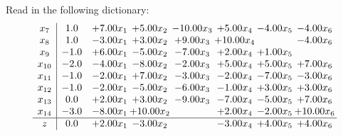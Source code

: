 \documentclass[9pt]{article}
\begin{document}
Read in the following dictionary:
\[\begin{array}{c| c c@{\hskip 2pt} c@{\hskip 2pt} c@{\hskip 2pt} c@{\hskip 2pt} c@{\hskip 2pt} c@{\hskip 2pt} }
 x_{7}   &  1.0 & +  7.00 x_{1} & +  5.00 x_{2} & -10.00 x_{3} & +  5.00 x_{4} & -4.00 x_{5} & -4.00 x_{6}\\
 x_{8}   &  1.0 & -3.00 x_{1} & +  3.00 x_{2} & +  9.00 x_{3} & + 10.00 x_{4} &   & -4.00 x_{6}\\
 x_{9}   &  -1.0 & +  6.00 x_{1} & -5.00 x_{2} & -7.00 x_{3} & +  2.00 x_{4} & +  1.00 x_{5} &   \\
 x_{10}   &  -2.0 & -4.00 x_{1} & -8.00 x_{2} & -2.00 x_{3} & +  5.00 x_{4} & +  5.00 x_{5} & +  7.00 x_{6}\\
 x_{11}   &  -1.0 & -2.00 x_{1} & +  7.00 x_{2} & -3.00 x_{3} & -2.00 x_{4} & -7.00 x_{5} & -3.00 x_{6}\\
 x_{12}   &  -1.0 & -2.00 x_{1} & -5.00 x_{2} & -6.00 x_{3} & -1.00 x_{4} & +  3.00 x_{5} & +  3.00 x_{6}\\
 x_{13}   &  0.0 & +  2.00 x_{1} & +  3.00 x_{2} & -9.00 x_{3} & -7.00 x_{4} & -5.00 x_{5} & +  7.00 x_{6}\\
 x_{14}   &  -3.0 & -8.00 x_{1} & + 10.00 x_{2} &   & +  2.00 x_{4} & -2.00 x_{5} & + 10.00 x_{6}\\
\hline
z    &  0.0 & +  2.00 x_{1} & -3.00 x_{2} &   & -3.00 x_{4} & +  4.00 x_{5} & +  4.00 x_{6}\\
\end{array}\]
\end{document}
